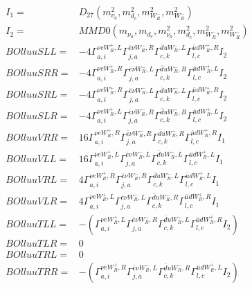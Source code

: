 \documentclass[A4,landscape]{article}
\begin{document}
\begin{align} 
I_1 = & D_{27}(m^2_{\nu_{{a}}}, m^2_{d_{{c}}}, m^2_{W_R^-}, m^2_{W_R^-}) \\ 
I_2 = & MMD0(m_{\nu_{{a}}}, m_{d_{{c}}}, m^2_{\nu_{{a}}}, m^2_{d_{{c}}}, m^2_{W_R^-}, m^2_{W_R^-}) \\ 
  BOlluuSLL= & -4  \Gamma^{\nu e W_R^+,L}_{a, i} \Gamma^{\bar{e}\nu W_R^- ,R}_{j, a} \Gamma^{\bar{d}u W_R^- ,L}_{c, k} \Gamma^{\bar{u}d W_R^+,R}_{l, c} I_2 \\ 
  BOlluuSRR= & -4  \Gamma^{\nu e W_R^+,R}_{a, i} \Gamma^{\bar{e}\nu W_R^- ,L}_{j, a} \Gamma^{\bar{d}u W_R^- ,R}_{c, k} \Gamma^{\bar{u}d W_R^+,L}_{l, c} I_2 \\ 
  BOlluuSRL= & -4  \Gamma^{\nu e W_R^+,R}_{a, i} \Gamma^{\bar{e}\nu W_R^- ,L}_{j, a} \Gamma^{\bar{d}u W_R^- ,L}_{c, k} \Gamma^{\bar{u}d W_R^+,R}_{l, c} I_2 \\ 
  BOlluuSLR= & -4  \Gamma^{\nu e W_R^+,L}_{a, i} \Gamma^{\bar{e}\nu W_R^- ,R}_{j, a} \Gamma^{\bar{d}u W_R^- ,R}_{c, k} \Gamma^{\bar{u}d W_R^+,L}_{l, c} I_2 \\ 
  BOlluuVRR= & 16  \Gamma^{\nu e W_R^+,R}_{a, i} \Gamma^{\bar{e}\nu W_R^- ,R}_{j, a} \Gamma^{\bar{d}u W_R^- ,R}_{c, k} \Gamma^{\bar{u}d W_R^+,R}_{l, c} I_1 \\ 
  BOlluuVLL= & 16  \Gamma^{\nu e W_R^+,L}_{a, i} \Gamma^{\bar{e}\nu W_R^- ,L}_{j, a} \Gamma^{\bar{d}u W_R^- ,L}_{c, k} \Gamma^{\bar{u}d W_R^+,L}_{l, c} I_1 \\ 
  BOlluuVRL= & 4  \Gamma^{\nu e W_R^+,R}_{a, i} \Gamma^{\bar{e}\nu W_R^- ,R}_{j, a} \Gamma^{\bar{d}u W_R^- ,L}_{c, k} \Gamma^{\bar{u}d W_R^+,L}_{l, c} I_1 \\ 
  BOlluuVLR= & 4  \Gamma^{\nu e W_R^+,L}_{a, i} \Gamma^{\bar{e}\nu W_R^- ,L}_{j, a} \Gamma^{\bar{d}u W_R^- ,R}_{c, k} \Gamma^{\bar{u}d W_R^+,R}_{l, c} I_1 \\ 
  BOlluuTLL= & -( \Gamma^{\nu e W_R^+,L}_{a, i} \Gamma^{\bar{e}\nu W_R^- ,R}_{j, a} \Gamma^{\bar{d}u W_R^- ,L}_{c, k} \Gamma^{\bar{u}d W_R^+,R}_{l, c} I_2) \\ 
  BOlluuTLR= & 0 \\ 
  BOlluuTRL= & 0 \\ 
  BOlluuTRR= & -( \Gamma^{\nu e W_R^+,R}_{a, i} \Gamma^{\bar{e}\nu W_R^- ,L}_{j, a} \Gamma^{\bar{d}u W_R^- ,R}_{c, k} \Gamma^{\bar{u}d W_R^+,L}_{l, c} I_2) \\ 
\end{align} 
\end{document}
